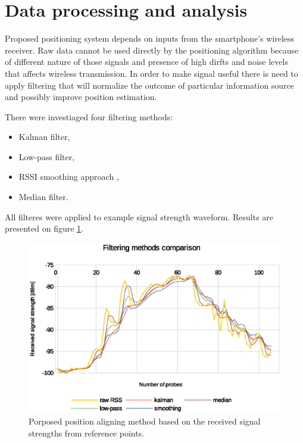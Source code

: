 \documentclass[../main.tex]{subfiles}
\begin{document}
\section{Data processing and analysis} %
\label{sec:data_processing}

Proposed positioning system depends on inputs from the smartphone's wireless receiver. Raw data cannot be used directly by the positioning algorithm because of different nature of those signals and presence of high dirfts and noise levels that affects wireless transmission. In order to make signal useful there is need to apply filtering that will normalize the outcome of particular information source and possibly improve position estimation.

There were investiaged four filtering methods:
\begin{itemize}
	\item Kalman filter,
	\item Low-pass filter,
	\item RSSI smoothing approach \cite{rssi_smoothing},
	\item Median filter.
\end{itemize}

All filteres were applied to example signal strength waveform. Results are presented on figure \ref{fig:filtering_comparison}.

\begin{figure}[!htbp]
\includegraphics[width=\textwidth]{pictures/filtering_comparison}
\centering
\caption{Porposed position aligning method based on the received signal strengths from reference points.}
\label{fig:filtering_comparison}
\end{figure}
\end{document}
